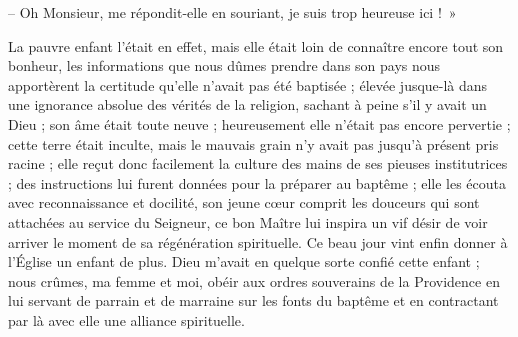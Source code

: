 \documentclass[11pt,a4paper]{report}
\begin{document}
-- Oh Monsieur, me répondit-elle en souriant, je suis trop heureuse ici !~»

La pauvre enfant l'était en effet, mais elle était loin de connaître encore tout son bonheur, les informations que nous dûmes prendre dans son pays nous apportèrent la certitude qu'elle n'avait pas été baptisée ; élevée jusque-là dans une ignorance absolue des vérités de la religion, sachant à peine s'il y avait un Dieu ; son âme était toute neuve ; heureusement elle n'était pas encore pervertie ; cette terre était inculte, mais le mauvais grain n'y avait pas jusqu'à présent pris racine ; elle reçut donc facilement la culture des mains de ses pieuses institutrices ; des instructions lui furent données pour la préparer au baptême ; elle les écouta avec reconnaissance et docilité, son jeune cœur comprit les douceurs qui sont attachées au service du Seigneur, ce bon Maître lui inspira un vif désir de voir arriver le moment de sa régénération spirituelle. Ce beau jour vint enfin donner à l'Église un enfant de plus. Dieu m'avait en quelque sorte confié cette enfant ; nous crûmes, ma femme et moi, obéir aux ordres souverains de la Providence en lui servant de parrain et de marraine sur les fonts du baptême et en contractant par là avec elle une alliance spirituelle.
\end{document}
